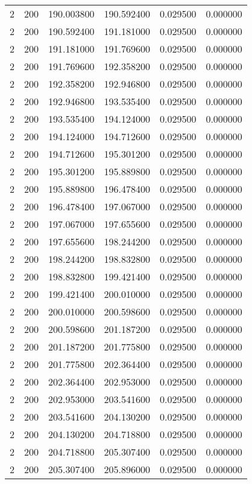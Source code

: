\begin{longtable}{rrrrrr}
2 & 200 & 190.003800 & 190.592400 & 0.029500 & 0.000000 \\
2 & 200 & 190.592400 & 191.181000 & 0.029500 & 0.000000 \\
2 & 200 & 191.181000 & 191.769600 & 0.029500 & 0.000000 \\
2 & 200 & 191.769600 & 192.358200 & 0.029500 & 0.000000 \\
2 & 200 & 192.358200 & 192.946800 & 0.029500 & 0.000000 \\
2 & 200 & 192.946800 & 193.535400 & 0.029500 & 0.000000 \\
2 & 200 & 193.535400 & 194.124000 & 0.029500 & 0.000000 \\
2 & 200 & 194.124000 & 194.712600 & 0.029500 & 0.000000 \\
2 & 200 & 194.712600 & 195.301200 & 0.029500 & 0.000000 \\
2 & 200 & 195.301200 & 195.889800 & 0.029500 & 0.000000 \\
2 & 200 & 195.889800 & 196.478400 & 0.029500 & 0.000000 \\
2 & 200 & 196.478400 & 197.067000 & 0.029500 & 0.000000 \\
2 & 200 & 197.067000 & 197.655600 & 0.029500 & 0.000000 \\
2 & 200 & 197.655600 & 198.244200 & 0.029500 & 0.000000 \\
2 & 200 & 198.244200 & 198.832800 & 0.029500 & 0.000000 \\
2 & 200 & 198.832800 & 199.421400 & 0.029500 & 0.000000 \\
2 & 200 & 199.421400 & 200.010000 & 0.029500 & 0.000000 \\
2 & 200 & 200.010000 & 200.598600 & 0.029500 & 0.000000 \\
2 & 200 & 200.598600 & 201.187200 & 0.029500 & 0.000000 \\
2 & 200 & 201.187200 & 201.775800 & 0.029500 & 0.000000 \\
2 & 200 & 201.775800 & 202.364400 & 0.029500 & 0.000000 \\
2 & 200 & 202.364400 & 202.953000 & 0.029500 & 0.000000 \\
2 & 200 & 202.953000 & 203.541600 & 0.029500 & 0.000000 \\
2 & 200 & 203.541600 & 204.130200 & 0.029500 & 0.000000 \\
2 & 200 & 204.130200 & 204.718800 & 0.029500 & 0.000000 \\
2 & 200 & 204.718800 & 205.307400 & 0.029500 & 0.000000 \\
2 & 200 & 205.307400 & 205.896000 & 0.029500 & 0.000000 \\

\end{longtable}
